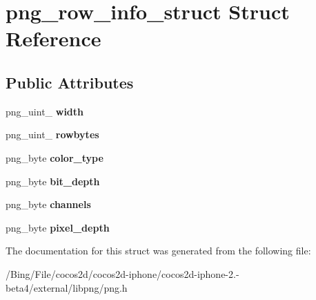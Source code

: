 \hypertarget{structpng__row__info__struct}{\section{png\-\_\-row\-\_\-info\-\_\-struct Struct Reference}
\label{structpng__row__info__struct}
}
\subsection*{Public Attributes}
\begin{DoxyCompactItemize}
\item 
\hypertarget{structpng__row__info__struct_a1ab107da5ffee8100eeaa76cc5ba3e62}{png\-\_\-uint\-\_ {\bfseries width}}\label{structpng__row__info__struct_a1ab107da5ffee8100eeaa76cc5ba3e62}

\item 
\hypertarget{structpng__row__info__struct_a9a8c82137959d6d390ab2ccff87ea83b}{png\-\_\-uint\-\_ {\bfseries rowbytes}}\label{structpng__row__info__struct_a9a8c82137959d6d390ab2ccff87ea83b}

\item 
\hypertarget{structpng__row__info__struct_a646244422549c66e6661cfcdb67c8e28}{png\-\_\-byte {\bfseries color\-\_\-type}}\label{structpng__row__info__struct_a646244422549c66e6661cfcdb67c8e28}

\item 
\hypertarget{structpng__row__info__struct_a6b14d5d0cc32f151c28c568cf1c1f82d}{png\-\_\-byte {\bfseries bit\-\_\-depth}}\label{structpng__row__info__struct_a6b14d5d0cc32f151c28c568cf1c1f82d}

\item 
\hypertarget{structpng__row__info__struct_a7cefee70361a3789a862001aefcd872f}{png\-\_\-byte {\bfseries channels}}\label{structpng__row__info__struct_a7cefee70361a3789a862001aefcd872f}

\item 
\hypertarget{structpng__row__info__struct_a70b84917ef9eabc9b7d29ec96fd01153}{png\-\_\-byte {\bfseries pixel\-\_\-depth}}\label{structpng__row__info__struct_a70b84917ef9eabc9b7d29ec96fd01153}

\end{DoxyCompactItemize}


The documentation for this struct was generated from the following file\-:\begin{DoxyCompactItemize}
\item 
/\-Bing/\-File/cocos2d/cocos2d-\/iphone/cocos2d-\/iphone-\/2.-\/beta4/external/libpng/png.\-h\end{DoxyCompactItemize}
